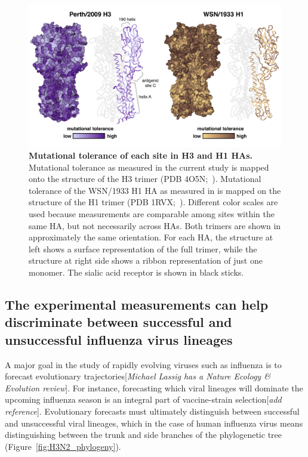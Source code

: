 \documentclass[9pt,twocolumn,twoside]{pnas-new}
\newcommand{\comment}[1]{{\color{red}[\textsl{#1}]}}
\begin{document}
\begin{figure}
\centering
\includegraphics[width=11.4cm]{figs/mut_tolerance/entropy_heatmap.pdf}
\caption{\label{fig:mut_tolerance}
{\bf Mutational tolerance of each site in H3 and H1 HAs.}
Mutational tolerance as measured in the current study is mapped onto the structure of the H3 trimer (PDB 4O5N;~\cite{lee2014receptor}).
Mutational tolerance of the WSN/1933 H1 HA as measured in \cite{doud2016accurate} is mapped on the structure of the H1 trimer (PDB 1RVX;~\cite{gamblin2004structure}).
Different color scales are used because measurements are comparable among sites within the same HA, but not necessarily across HAs.
Both trimers are shown in approximately the same orientation. 
For each HA, the structure at left shows a surface representation of the full trimer, while the structure at right side shows a ribbon representation of just one monomer.
The sialic acid receptor is shown in black sticks.
}
\end{figure}

\subsection*{The experimental measurements can help discriminate between successful and unsuccessful influenza virus lineages}
A major goal in the study of rapidly evolving viruses such as influenza is to forecast evolutionary trajectories\comment{Michael Lassig has a Nature Ecology \& Evolution review}.
For instance, forecasting which viral lineages will dominate the upcoming influenza season is an integral part of vaccine-strain selection\comment{add reference}. 
Evolutionary forecasts must ultimately distinguish between successful and unsuccessful viral lineages, which in the case of human influenza virus means distinguishing between the trunk and side branches of the phylogenetic tree (Figure~\ref{fig:H3N2_phylogeny}).
\end{document}

